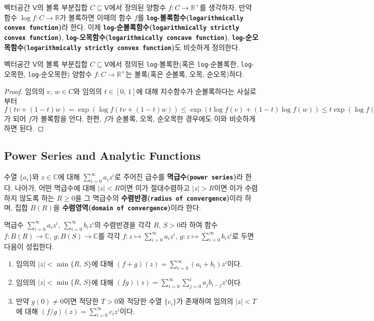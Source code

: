 \begin{definition}
    벡터공간 $\mathsf{V}$의 볼록 부분집합 $C\subseteq\mathsf{V}$에서 정의된 양함수 $f:C\to\mathbb{R}^+$를 생각하자. 만약 함수 $\log f:C\to\mathbb{R}$가 볼록하면 이때의 함수 $f$를 \textbf{\texttt{log}-볼록함수(\texttt{logarithmically convex function})}라 한다. 이제 \textbf{\texttt{log}-순볼록함수(\texttt{logarithmically strictly convex function})}, \textbf{\texttt{log}-오목함수(\texttt{logarithmically concave function})}, \textbf{\texttt{log}-순오목함수(\texttt{logarithmically strictly convex function})}도 비슷하게 정의한다.
\end{definition}

\begin{theorem}
    벡터공간 $\mathsf{V}$의 볼록 부분집합 $C\subseteq\mathsf{V}$에서 정의된 \texttt{log}-볼록한(혹은 \texttt{log}-순볼록한, \texttt{log}-오목한, \texttt{log}-순오목한) 양함수 $f:C\to\mathbb{R}^+$는 볼록(혹은 순볼록, 오목, 순오목)하다.
\end{theorem}

\begin{proof}
    임의의 $v,\,w\in C$와 임의의 $t\in[0,\,1]$에 대해 지수함수가 순볼록하다는 사실로부터 $f(tv+(1-t)w)=\exp(\log f(tv+(1-t)w))\leq\exp(t\log f(v)+(1-t)\log f(w))\leq t\exp(\log f(v))+(1-t)\exp(\log f(w))=tf(v)+(1-t)f(w)$가 되어 $f$가 볼록함을 안다. 한편, $f$가 순볼록, 오목, 순오목한 경우에도 이와 비슷하게 하면 된다.
\end{proof}

\subsection{Power Series and Analytic Functions}

\begin{definition}
    수열 $\{a_i\}$와 $z\in\mathbb{C}$에 대해 $\sum_{i=0}^\infty a_iz^i$로 주어진 급수를 \textbf{멱급수(\texttt{power series})}라 한다. 나아가, 어떤 멱급수에 대해 $|z|<R$이면 이가 절대수렴하고 $|z|>R$이면 이가 수렴하지 않도록 하는 $R\geq0$을 그 멱급수의 \textbf{수렴반경(\texttt{radius of convergence})}이라 하며, 집합 $B(R)$을 \textbf{수렴영역(\texttt{domain of convergence})}이라 한다.
\end{definition}

\begin{theorem}\label{thm:powerSeriesProp}
    멱급수 $\sum_{i=0}^\infty a_iz^i,\,\sum_{i=0}^\infty b_iz^i$의 수렴반경을 각각 $R,\,S>0$라 하여 함수 $f:B(R)\to\mathbb{C},\,g:B(S)\to\mathbb{C}$를 각각 $f:z\mapsto\sum_{i=0}^\infty a_iz^i,\,g:z\mapsto\sum_{i=0}^\infty b_iz^i$로 두면 다음이 성립한다.
    \begin{enumerate}
        \item 임의의 $|z|<\min\{R,\,S\}$에 대해 $(f+g)(z)=\sum_{i=0}^\infty(a_i+b_i)z^i$이다.
        \item 임의의 $|z|<\min\{R,\,S\}$에 대해 $(fg)(z)=\sum_{i=0}^\infty\sum_{j=0}^ia_jb_{i-j}z^i$이다.
        \item 만약 $g(0)\ne0$이면 적당한 $T>0$와 적당한 수열 $\{c_i\}$가 존재하여 임의의 $|z|<T$에 대해 $(f/g)(z)=\sum_{i=0}^\infty c_iz^i$이다.
    \end{enumerate}
\end{theorem}

